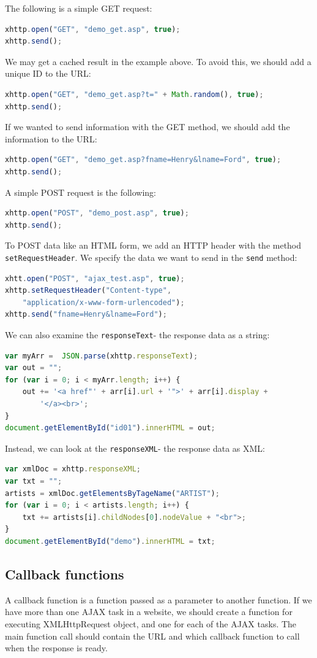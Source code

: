 \documentclass[a4paper, openany]{memoir}
\begin{document}
The following is a simple GET request:
\begin{lstlisting}[language=javascript]
xhttp.open("GET", "demo_get.asp", true);	
xhttp.send();
\end{lstlisting}
We may get a cached result in the example above. To avoid this, we should add a unique ID to the URL:
\begin{lstlisting}[language=javascript]
xhttp.open("GET", "demo_get.asp?t=" + Math.random(), true);	
xhttp.send();
\end{lstlisting}
If we wanted to send information with the GET method, we should add the information to the URL:
\begin{lstlisting}[language=javascript]
xhttp.open("GET", "demo_get.asp?fname=Henry&lname=Ford", true);
xhttp.send();
\end{lstlisting}
A simple POST request is the following:
\begin{lstlisting}[language=javascript]
xhttp.open("POST", "demo_post.asp", true);
xhttp.send();
\end{lstlisting}
To POST data like an HTML form, we add an HTTP header with the method \texttt{setRequestHeader}. We specify the data we want to send in the \texttt{send} method:
\begin{lstlisting}[language=javascript]
xhtt.open("POST", "ajax_test.asp", true);
xhttp.setRequestHeader("Content-type",
    "application/x-www-form-urlencoded");
xhttp.send("fname=Henry&lname=Ford");
\end{lstlisting}
We can also examine the \texttt{responseText}- the response data as a string:
\begin{lstlisting}[language=javascript]
var myArr =  JSON.parse(xhttp.responseText);
var out = "";
for (var i = 0; i < myArr.length; i++) {
    out += '<a href"' + arr[i].url + '">' + arr[i].display + 
        '</a><br>';
}
document.getElementById("id01").innerHTML = out;
\end{lstlisting}
Instead, we can look at the \texttt{responseXML}- the response data as XML:
\begin{lstlisting}[language=javascript]
var xmlDoc = xhttp.responseXML;
var txt = "";
artists = xmlDoc.getElementsByTageName("ARTIST");
for (var i = 0; i < artists.length; i++) {
    txt += artists[i].childNodes[0].nodeValue + "<br">;
}
document.getElementById("demo").innerHTML = txt;
\end{lstlisting}

\subsection{Callback functions}
A callback function is a function passed as a parameter to another function. If we have more than one AJAX task in a website, we should create a function for executing XMLHttpRequest object, and one for each of the AJAX tasks. The main function call should contain the URL and which callback function to call when the response is ready.
\end{document}
